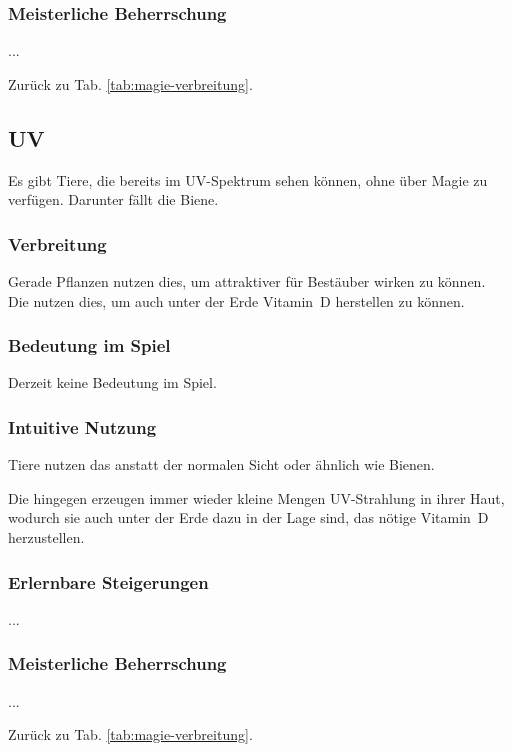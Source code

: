 \subsubsection{Meisterliche Beherrschung} 
\begin{outline}
	\1 ...
\end{outline}
Zurück zu Tab. \ref{tab:magie-verbreitung}.



\subsection{UV}\label{magie:uv}
Es gibt Tiere, die bereits im UV-Spektrum sehen können, ohne über Magie zu verfügen. 
Darunter fällt die Biene.

\subsubsection{Verbreitung}
Gerade Pflanzen nutzen dies, um attraktiver für Bestäuber wirken zu können. \\
Die  nutzen dies, um auch unter der Erde Vitamin~D herstellen zu können.

\subsubsection{Bedeutung im Spiel}
Derzeit keine Bedeutung im Spiel.

\subsubsection{Intuitive Nutzung}
Tiere nutzen das \zB anstatt der normalen Sicht oder ähnlich wie Bienen.

Die  hingegen erzeugen immer wieder kleine Mengen UV-Strahlung in ihrer Haut, wodurch sie auch unter der Erde dazu in der Lage sind, das nötige Vitamin~D herzustellen.

\subsubsection{Erlernbare Steigerungen}
\begin{outline}
	\1 ...
\end{outline}

\subsubsection{Meisterliche Beherrschung} 
\begin{outline}
	\1 ...
\end{outline}
Zurück zu Tab. \ref{tab:magie-verbreitung}.



